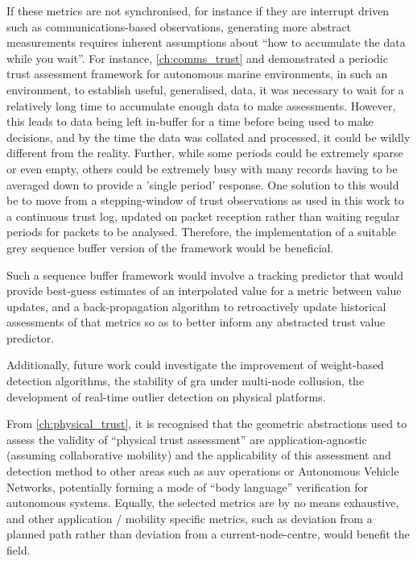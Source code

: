 If these metrics are not synchronised, for instance if they are interrupt driven such as communications-based observations, generating more abstract measurements requires inherent assumptions about ``how to accumulate the data while you wait''. 
For instance, \autoref{ch:comms_trust} and \cite{Bolster2015} demonstrated a periodic trust assessment framework for autonomous marine environments, in such an environment, to establish useful, generalised, data, it was necessary to wait for a relatively long time to accumulate enough data to make assessments.
However, this leads to data being left in-buffer for a time before being used to make decisions, and by the time the data was collated and processed, it could be wildly different from the reality. 
Further, while some periods could be extremely sparse or even empty, others could be extremely busy with many records having to be averaged down to provide a 'single period' response. 
One solution to this would be to move from a stepping-window of trust observations as used in this work to a continuous trust log, updated on packet reception rather than waiting regular periods for packets to be analysed.
Therefore, the implementation of a suitable grey sequence buffer version of the framework would be beneficial.

Such a sequence buffer framework would involve a tracking predictor that would provide best-guess estimates of an interpolated value for a metric between value updates, and a back-propagation algorithm to retroactively update historical assessments of that metrics so as to better inform any abstracted trust value predictor.

Additionally, future work could investigate the improvement of weight-based detection algorithms, the stability of \gls{gra} under multi-node collusion, the development of real-time outlier detection on physical platforms.

From \autoref{ch:physical_trust}, it is recognised that the geometric abstractions used to assess the validity of ``physical trust assessment'' are application-agnostic (assuming collaborative mobility) and the applicability of this assessment and detection method to other areas such as \gls{auv} operations or Autonomous Vehicle Networks, potentially forming a mode of ``body language'' verification for autonomous systems. 
Equally, the selected metrics are by no means exhaustive, and other application / mobility specific metrics, such as deviation from a planned path rather than deviation from a current-node-centre, would benefit the field.


